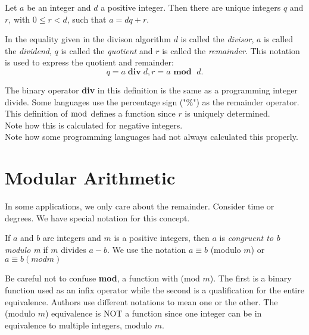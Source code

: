 \begin {theorem}   Let $a$ be an integer and $d$ a positive integer. Then there are unique integers $q$ and $r$, with $0 \leq r < d$, such that $a=dq+r$.
\end {theorem}

\begin {definition}
In the equality given in the divison algorithm $d$ is called the \textit{divisor}, $a$ is called the \textit{dividend}, $q$ is called the \textit{quotient} and $r$ is called the \textit{remainder}. This notation is used to express the quotient and remainder:
     $$ q=a\; \mathbf{div} \;d,    r=a  \textbf{ mod }\; d. $$
\end {definition}

\begin{notes}
The binary operator \textbf{div} in this definition is the same as a programming integer divide. 
Some languages use the percentage sign ("\%") as the remainder operator.
This definition of $\bmod$ defines a function since $r$ is uniquely determined.\\ 
Note how this is calculated for negative integers.\\
Note how some programming languages had not always calculated this properly.
\end{notes}

\section {Modular Arithmetic}
In some applications, we only care about the remainder. Consider time or degrees. We have special notation for this concept.

\begin{definition}
If $a$ and $b$ are integers and $m$ is a positive integers, then $a$ is \textit{congruent to b modulo m} if $m$ divides $a-b$. We use the notation $a \equiv b$ (modulo $m$) or $a \equiv b (mod m)$
\end {definition}

\begin{notes}
Be careful not to confuse \textbf{mod}, a function with (mod $m$). The first is a binary function used as an infix operator while the second is a qualification for the entire equivalence. Authors use different notations to mean one or the other. The (modulo $m$) equivalence is NOT a function since one integer can be in equivalence to multiple integers, modulo $m$.
\end{notes}

